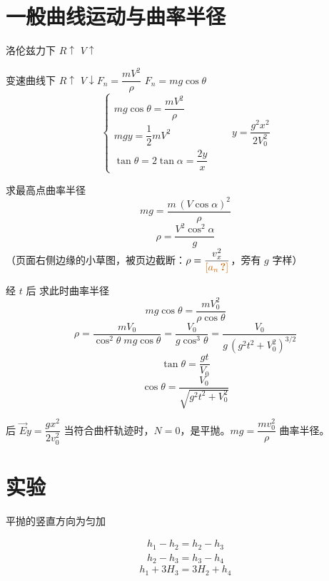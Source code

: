 \section{一般曲线运动与曲率半径}
洛伦兹力下 $R\uparrow$ $V\uparrow$

变速曲线下 $R\uparrow$ $V\downarrow$\qquad $F_n=\dfrac{mV^2}{\rho}$
$F_n=mg\cos\theta$
\[
\begin{cases}
mg\cos\theta=\dfrac{mV^2}{\rho}\\[4pt]
mgy=\dfrac12mV^2\\[4pt]
\tan\theta=2\tan\alpha=\dfrac{2y}{x}
\end{cases}
\qquad
y=\dfrac{g^2x^2}{2V_0^2}
\]

求最高点曲率半径
\[ mg=\frac{m\,(V\cos\alpha)^{2}}{\rho} \]
\[ \rho=\frac{V^{2}\cos^{2}\alpha}{g} \] %
（页面右侧边缘的小草图，被页边截断：$\rho=\dfrac{v_x^{2}}{\text{\unclear{$a_n$}}}$，旁有 $g$ 字样）

经 $t$ 后 求此时曲率半径
\[ mg\cos\theta=\frac{mV_0^{2}}{\rho\cos\theta} \] %
\[ \rho=\frac{mV_0}{\cos^{2}\theta\; mg\cos\theta}=\frac{V_0}{g\cos^{3}\theta}=\frac{V_0}{g\,(g^{2}t^{2}+V_0^{2})^{3/2}} \] %
\[ \tan\theta=\frac{gt}{V_0} \]
\[ \cos\theta=\frac{V_0}{\sqrt{g^{2}t^{2}+V_0^{2}}} \]

后 $\vec{E}$\quad $y=\dfrac{gx^2}{2v_0^2}$ 当符合曲杆轨迹时，$N=0$，是平抛。$mg=\dfrac{mv_0^2}{\rho}$ 曲率半径。


\section{实验}
平抛的竖直方向为匀加


\begin{gather*}
h_1-h_2=h_2-h_3\\
h_2-h_3=h_3-h_4
\end{gather*}
\[ h_1+3H_3=3H_2+h_4 \]%

